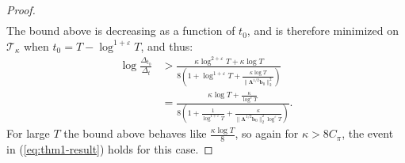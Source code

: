 \begin{proof}
\begin{align*}
\end{align*}
The bound above is decreasing as a function of $t_0$, and is therefore minimized on $\mathcal{T}_\kappa$ when $t_0 = T - \log^{1+\varepsilon} T$, and thus:
\begin{align*}
    \log \frac{\Delta_{t_0}}{\Delta_t} &> \frac{\kappa\log^{2+\varepsilon} T + \kappa \log T}{8\left(1 + \log^{1+\varepsilon} T + \frac{\kappa\log T}{\lVert\boldsymbol{\Lambda}^{1/2}\mathbf{b}_0\rVert_2^2} \right)} \\
    &= \frac{\kappa\log T + \frac{\kappa}{\log^\varepsilon T}}{8\left(1 +\frac{1}{\log^{1+\varepsilon} T}+ \frac{\kappa}{\lVert\boldsymbol{\Lambda}^{1/2}\mathbf{b}_0\rVert_2^2\log^{\varepsilon} T} \right)}.
\end{align*}
For large $T$ the bound above behaves like $\frac{\kappa \log T}{8}$, so again for $\kappa > 8 C_\pi$, the event in (\ref{eq:thm1-result}) holds for this case.

\end{proof}